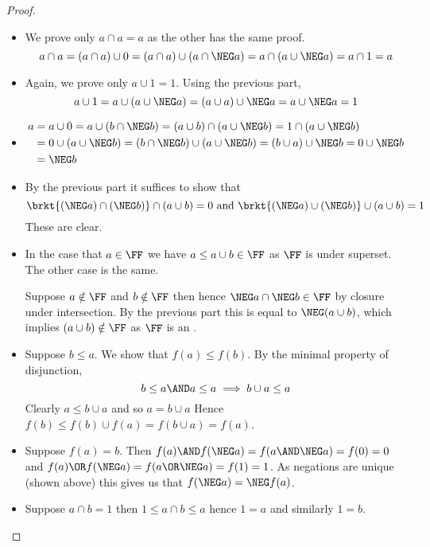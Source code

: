 \begin{proof}~
    \begin{itemize}
        \item We prove only $a \cap a = a$ as the other has the same proof.
            \[a \cap a = (a \cap a) \cup 0 = (a \cap a) \cup (a \cap \NEG a)
            = a \cap (a \cup \NEG a) = a \cap 1 = a\]
        \item Again, we prove only $a \cup 1 = 1$. Using the previous part,
            \[a \cup 1 = a \cup (a \cup \NEG a) = (a \cup a) \cup \NEG a
            = a \cup \NEG a = 1\]
        \item \begin{align*}
            a &= a \cup 0 = a \cup (b \cap \NEG b) = 
            (a \cup b) \cap (a \cup \NEG b) = 1 \cap (a \cup \NEG b)\\
            &= 0 \cup (a \cup \NEG b) = (b \cap \NEG b) \cup (a \cup \NEG b)
            = (b \cup a) \cup \NEG b = 0 \cup \NEG b \\
            &= \NEG b
        \end{align*} 
        \item By the previous part it suffices to show that 
            \[\brkt{(\NEG a) \cap (\NEG b)} \cap (a \cup b) = 0 \text{ and }
            \brkt{(\NEG a) \cup (\NEG b) } \cup (a \cup b) = 1\]
            These are clear.
        \item \begin{forward}
            In the case that $a \in \FF$ we have $a \leq a \cup b \in \FF$ 
            as $\FF$ is under superset. 
            The other case is the same.
        \end{forward}
        \begin{backward}
            Suppose $a \notin \FF$ and $b \notin \FF$ then
             hence $\NEG a \cap \NEG b \in \FF$
                by closure under intersection. 
                By the previous part this is equal to $\NEG (a \cup b)$,
                which implies $(a \cup b) \notin \FF$ as $\FF$ 
                is an .
        \end{backward}
        \item Suppose $b \leq a$. 
            We show that $f(a) \leq f(b)$.
            By the minimal property of disjunction,
            \[b \leq a \AND a \leq a \implies b \cup a \leq a\]
            Clearly $a \leq b \cup a$ and so $a = b \cup a$
            Hence $f(b) \leq f(b) \cup f(a) = f(b \cup a) = f(a)$.
        \item Suppose $f(a) = b$.
            Then $f(a) \AND f(\NEG a) = f(a \AND \NEG a) = f(0) = 0$
            and $f(a) \OR f(\NEG a) = f(a \OR \NEG a) = f(1) = 1$.
            As negations are unique (shown above) 
            this gives us that $f(\NEG a) = \NEG f(a)$.
        \item Suppose $a \cap b = 1$ then $1 \leq a \cap b \leq a$ hence $1 = a$
            and similarly $1 = b$.
    \end{itemize}
\end{proof}


